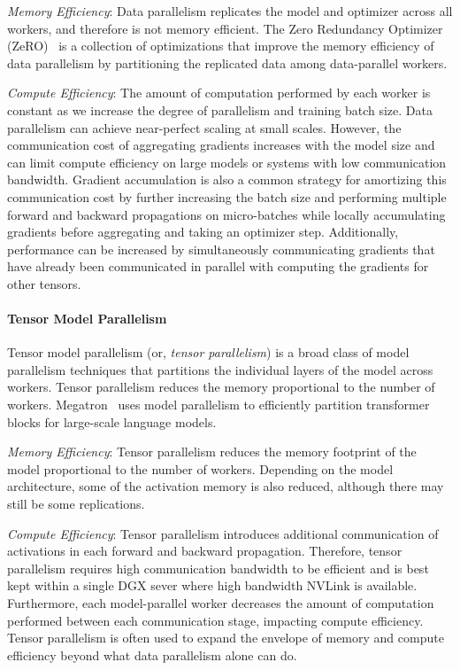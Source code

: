 \documentclass[11pt]{article}
\begin{document}
\textit{Memory Efficiency}: Data parallelism replicates the model and optimizer
across all workers, and therefore is not memory efficient.
The Zero Redundancy Optimizer (ZeRO)~\cite{rajbhandari2020zero} is a collection
of optimizations that improve the memory efficiency of data parallelism by 
partitioning the replicated data among data-parallel workers.

\textit{Compute Efficiency}: The amount of computation performed by each worker
is constant as we increase the degree of parallelism and training batch size.
Data parallelism can achieve near-perfect scaling at small scales.
However, the communication cost of
aggregating gradients increases with the model size and
can limit compute efficiency on large models or systems with low communication
bandwidth.
Gradient accumulation is also a common strategy for amortizing this
communication cost by further increasing the batch size and performing multiple
forward and backward propagations on micro-batches while locally accumulating
gradients before aggregating and taking an optimizer step. Additionally,
performance can be increased by simultaneously communicating gradients that have
already been communicated in parallel with computing the gradients for other tensors.

\paragraph{Tensor Model Parallelism}
Tensor model parallelism (or, \emph{tensor parallelism})
is a broad class of model parallelism techniques that partitions the
individual layers of the model across workers. Tensor parallelism reduces the
memory proportional to the number of workers. Megatron~\cite{megatron-DBLP:journals/corr/abs-1909-08053} uses model parallelism
to efficiently partition transformer blocks for large-scale language models.


\textit{Memory Efficiency}: Tensor parallelism reduces the memory footprint of
the model proportional to the number of workers. Depending on the model
architecture, some of the activation memory is also reduced, although there may
still be some replications.

\textit{Compute Efficiency}: Tensor parallelism introduces additional communication of activations in each forward and backward
propagation. Therefore, tensor parallelism requires high communication bandwidth to be
efficient and is best kept within a single DGX sever where high bandwidth NVLink is available. Furthermore, each model-parallel worker decreases the
amount of computation performed between each communication stage, impacting
compute efficiency. Tensor parallelism is often used to expand the envelope of memory and compute efficiency beyond what data parallelism alone can do.
\end{document}
